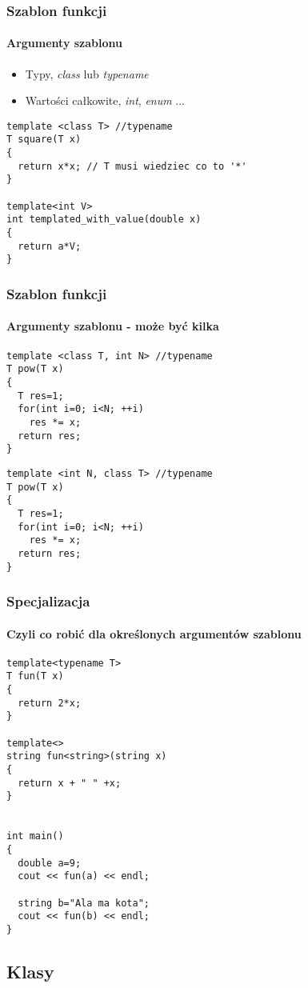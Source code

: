 \documentclass[10pt]{beamer}
\begin{document}
\begin{frame}[fragile]
  \frametitle{Szablon funkcji}
  \framesubtitle{Argumenty szablonu}
  \begin{itemize}
    \item Typy, \textit{class} lub \textit{typename}
    \item Wartości całkowite, \textit{int}, \textit{enum} ...
  \end{itemize}
  
\begin{lstlisting}
template <class T> //typename
T square(T x)
{
  return x*x; // T musi wiedziec co to '*'
}

template<int V>
int templated_with_value(double x)
{
  return a*V;
}
\end{lstlisting}
  
\end{frame}

\begin{frame}[fragile]
  \frametitle{Szablon funkcji}
  \framesubtitle{Argumenty szablonu - może być kilka}
  
  \begin{lstlisting}
template <class T, int N> //typename
T pow(T x)
{
  T res=1;
  for(int i=0; i<N; ++i)
    res *= x;
  return res;
}
\end{lstlisting}

\begin{lstlisting}
template <int N, class T> //typename
T pow(T x)
{
  T res=1;
  for(int i=0; i<N; ++i)
    res *= x;
  return res;
}
\end{lstlisting}
  
\end{frame}

\begin{frame}[fragile]
  \frametitle{Specjalizacja}
  \framesubtitle{Czyli co robić dla określonych argumentów szablonu}

\begin{lstlisting}
template<typename T>
T fun(T x)
{
  return 2*x;
}

template<>
string fun<string>(string x)
{
  return x + " " +x;
}


int main()
{
  double a=9;
  cout << fun(a) << endl;
  
  string b="Ala ma kota";
  cout << fun(b) << endl;
}
\end{lstlisting}
\end{frame}

\subsection{Klasy}
\end{document}
